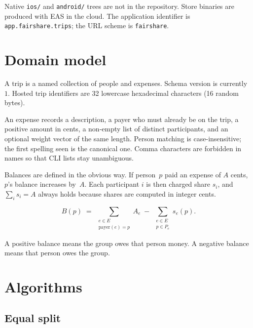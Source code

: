 \documentclass[11pt,a4paper]{article}
\newcommand{\code}[1]{\texttt{#1}}
\begin{document}
Native \code{ios/} and \code{android/} trees are not in the repository.
Store binaries are produced with EAS in the cloud.
The application identifier is \code{app.fairshare.trips}; the URL scheme is \code{fairshare}.

\section{Domain model}

A trip is a named collection of people and expenses.
Schema version is currently~$1$.
Hosted trip identifiers are 32 lowercase hexadecimal characters (16 random bytes).

An expense records a description, a payer who must already be on the trip, a positive amount in cents, a non-empty list of distinct participants, and an optional weight vector of the same length.
Person matching is case-insensitive; the first spelling seen is the canonical one.
Comma characters are forbidden in names so that CLI lists stay unambiguous.

Balances are defined in the obvious way.
If person~$p$ paid an expense of $A$ cents, $p$'s balance increases by~$A$.
Each participant $i$ is then charged share $s_i$, and $\sum_i s_i = A$ always holds because shares are computed in integer cents.

\begin{equation}
  B(p)
  \;=\;
  \sum_{\substack{e \in E \\ \mathrm{payer}(e)=p}} A_e
  \;-\;
  \sum_{\substack{e \in E \\ p \in P_e}} s_e(p).
\end{equation}

A positive balance means the group owes that person money.
A negative balance means that person owes the group.

\section{Algorithms}

\subsection{Equal split}
\end{document}
